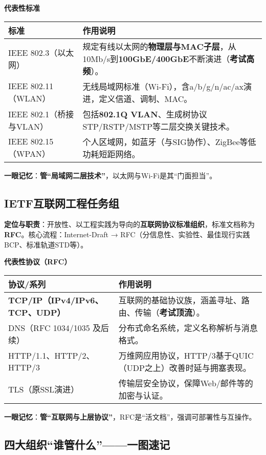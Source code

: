 \documentclass[lang=cn,newtx,10pt,scheme=chinese]{../../elegantbook}
\begin{document}
	\textbf{代表性标准}
\begin{longtable}{|p{4cm}|p{8cm}|}
\hline
	\textbf{标准} & \textbf{作用说明} \\
\hline
IEEE 802.3（以太网） & 规定有线以太网的\textbf{物理层与MAC子层}，从10Mb/s到\textbf{100GbE/400GbE}不断演进（\textbf{考试高频}）。 \\
\hline
IEEE 802.11（WLAN） & 无线局域网标准（Wi-Fi），含a/b/g/n/ac/ax演进，定义信道、调制、MAC。 \\
\hline
IEEE 802.1（桥接与VLAN） & 包括\textbf{802.1Q VLAN}、生成树协议STP/RSTP/MSTP等二层交换关键技术。 \\
\hline
IEEE 802.15（WPAN） & 个人区域网，如蓝牙（与SIG协作）、ZigBee等低功耗短距网络。 \\
\hline
\end{longtable}

	\textbf{一眼记忆}：\textbf{管“局域网二层技术”}，以太网与Wi-Fi是其“门面担当”。

\subsection{IETF互联网工程任务组}
	\textbf{定位与职责}：开放性、以工程实践为导向的\textbf{互联网协议标准组织}，标准文档称为\textbf{RFC}。核心流程：Internet-Draft → RFC（分信息性、实验性、最佳现行实践BCP、标准轨道STD等）。

	\textbf{代表性协议（RFC）}
\begin{longtable}{|p{4cm}|p{8cm}|}
\hline
	\textbf{协议/系列} & \textbf{作用说明} \\
\hline
	\textbf{TCP/IP（IPv4/IPv6、TCP、UDP）} & 互联网的基础协议族，涵盖寻址、路由、传输（\textbf{考试顶流}）。 \\
\hline
DNS（RFC 1034/1035 及后续） & 分布式命名系统，定义名称解析与消息格式。 \\
\hline
HTTP/1.1、HTTP/2、HTTP/3 & 万维网应用协议，HTTP/3基于QUIC（UDP之上）改善时延与拥塞表现。 \\
\hline
TLS（原SSL演进） & 传输层安全协议，保障Web/邮件等的加密与认证。 \\
\hline
\end{longtable}

	\textbf{一眼记忆}：\textbf{管“互联网与上层协议”}，RFC是“活文档”，强调可部署性与互操作。

\subsection{四大组织“谁管什么”——一图速记}
\end{document}
